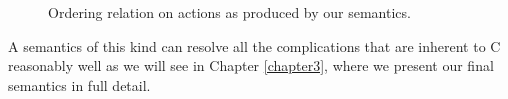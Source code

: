 \documentclass[a4paper,12pt]{scrbook}
\theoremstyle{plain}
\theoremstyle{definition}
\begin{document}
\begin{figure}[tb]
\centering
\caption{Ordering relation on actions as produced by our semantics.}
\label{sbExample}
\end{figure}

A semantics of this kind can resolve all the complications that are inherent to
C reasonably well as we will see in Chapter \ref{chapter3}, where we present our
final semantics in full detail.




\end{document}
